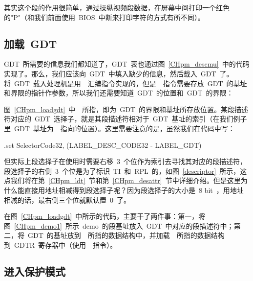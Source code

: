\label{CHpm_demo1}

其实这个段的作用很简单，通过操纵视频段数据，在屏幕中间打印一个红色的"P"（和我们前面使用~BIOS~中断来打印字符的方式有所不同）。

\subsection{加载~GDT} \label{CHpm_secloadgdt}

GDT~所需要的信息我们都知道了，GDT~表也通过图~\ref{CHpm_descmu}~中的代码实现了。那么，我们应该向~GDT~中填入缺少的信息，然后载入~GDT~了。将~GDT~载入处理机是用~~汇编指令实现的，但是~~指令需要存放~GDT~的基址和界限的指针作参数，所以我们还需要知道~GDT~的位置和~GDT~的界限：

\label{CHpm_loadgdt}

图~\ref{CHpm_loadgdt}~中~~所指，即为~GDT~的界限和基址所存放位置。某段描述符对应的~GDT~选择子，就是其段描述符相对于~GDT~基址的索引（在我们例子里~GDT~基址为~~指向的位置）。这里需要注意的是，虽然我们在代码中写：

\begin{Command}
.set SelectorCode32, (LABEL_DESC_CODE32 - LABEL_GDT)
\end{Command}
但实际上段选择子在使用时需要右移~3~个位作为索引去寻找其对应的段描述符，段选择子的右侧~3~个位是为了标识~TI~和~RPL~的，如图~\ref{descriptor}~所示，这点我们将在第~\ref{CHpm_ldt}~节和第~\ref{CHpm_desattr}~节中详细介绍。但是这里为什么能直接用地址相减得到段选择子呢？因为段选择子的大小是~8 bit~，用地址相减的话，最右侧三个位就默认置~0~了。

在图~\ref{CHpm_loadgdt}~中所示的代码，主要干了两件事：第一，将图~\ref{CHpm_demo1}~所示~demo~的段基址放入~GDT~中对应的段描述符中；第二，将~GDT~的基址放到~~所指的数据结构中，并加载~~所指的数据结构到~GDTR~寄存器中（使用~~指令）。

\subsection{进入保护模式}

